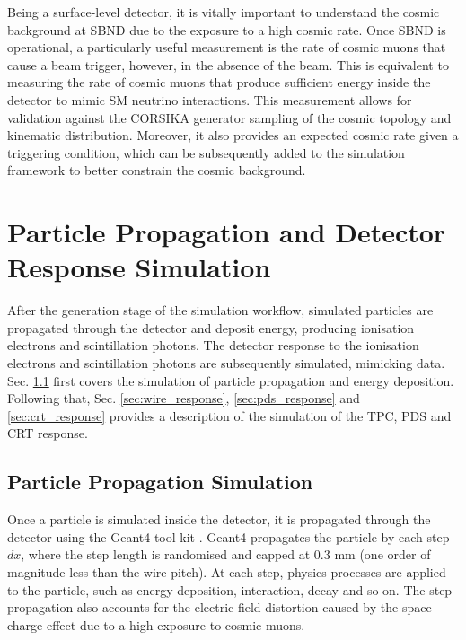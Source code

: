 Being a surface-level detector, it is vitally important to understand the cosmic background at SBND due to the exposure to a high cosmic rate.
Once SBND is operational, a particularly useful measurement is the rate of cosmic muons that cause a beam trigger, however, in the absence of the beam.
This is equivalent to measuring the rate of cosmic muons that produce sufficient energy inside the detector to mimic SM neutrino interactions.
This measurement allows for validation against the CORSIKA generator sampling of the cosmic topology and kinematic distribution. 
Moreover, it also provides an expected cosmic rate given a triggering condition, which can be subsequently added to the simulation framework to better constrain the cosmic background.                   

\section{Particle Propagation and Detector Response Simulation}
\label{sec:gen_response}


After the generation stage of the simulation workflow, simulated particles are propagated through the detector and deposit energy, producing ionisation electrons and scintillation photons.
The detector response to the ionisation electrons and scintillation photons are subsequently simulated, mimicking data. 
Sec. \ref{sec:gen_g4} first covers the simulation of particle propagation and energy deposition.
Following that, Sec. \ref{sec:wire_response}, \ref{sec:pds_response} and \ref{sec:crt_response} provides a description of the simulation of the TPC, PDS and CRT response. 

\subsection{Particle Propagation Simulation}
\label{sec:gen_g4}

Once a particle is simulated inside the detector, it is propagated through the detector using the Geant4 tool kit \cite{geant4}.
Geant4 propagates the particle by each step $dx$, where the step length is randomised and capped at 0.3 mm (one order of magnitude less than the wire pitch).
At each step, physics processes are applied to the particle, such as energy deposition, interaction, decay and so on.
The step propagation also accounts for the electric field distortion caused by the space charge effect due to a high exposure to cosmic muons.

